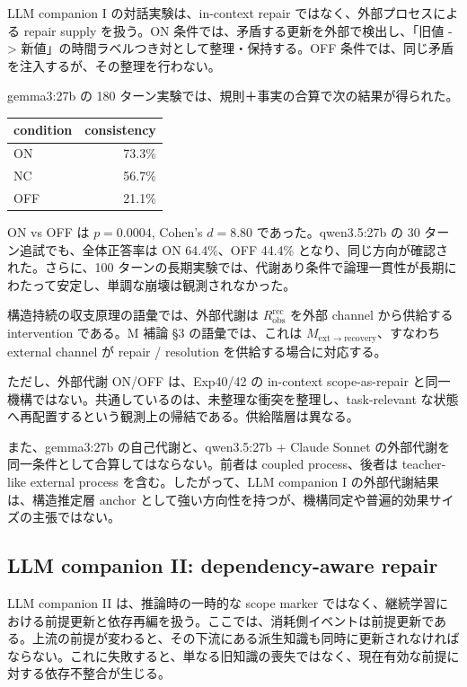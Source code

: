 \documentclass[12pt,a4paper]{article}
\begin{document}
LLM companion I の対話実験は、in-context repair ではなく、外部プロセスによる repair supply を扱う。ON 条件では、矛盾する更新を外部で検出し、「旧値 -\textgreater{} 新値」の時間ラベルつき対として整理・保持する。OFF 条件では、同じ矛盾を注入するが、その整理を行わない。

gemma3:27b の 180 ターン実験では、規則＋事実の合算で次の結果が得られた。

{\def\LTcaptype{table} %
\begin{longtable}[]{@{}lr@{}}
\toprule\noalign{}
condition & consistency \\
\midrule\noalign{}
\endhead
\bottomrule\noalign{}
\endlastfoot
ON & 73.3\% \\
NC & 56.7\% \\
OFF & 21.1\% \\
\end{longtable}
}

ON vs OFF は \(p=0.0004\), Cohen's \(d=8.80\) であった。qwen3.5:27b の 30 ターン追試でも、全体正答率は ON 64.4\%、OFF 44.4\% となり、同じ方向が確認された。さらに、100 ターンの長期実験では、代謝あり条件で論理一貫性が長期にわたって安定し、単調な崩壊は観測されなかった。

構造持続の収支原理の語彙では、外部代謝は \(R_{\mathrm{obs}}^{\mathrm{rec}}\) を外部 channel から供給する intervention である。M 補論 §3 の語彙では、これは \(M_{\mathrm{ext}\to\mathrm{recovery}}\)、すなわち external channel が repair / resolution を供給する場合に対応する。

ただし、外部代謝 ON/OFF は、Exp40/42 の in-context scope-as-repair と同一機構ではない。共通しているのは、未整理な衝突を整理し、task-relevant な状態へ再配置するという観測上の帰結である。供給階層は異なる。

また、gemma3:27b の自己代謝と、qwen3.5:27b + Claude Sonnet の外部代謝を同一条件として合算してはならない。前者は coupled process、後者は teacher-like external process を含む。したがって、LLM companion I の外部代謝結果は、構造推定層 anchor として強い方向性を持つが、機構同定や普遍的効果サイズの主張ではない。

\subsection{LLM companion II: dependency-aware repair}\label{llm-companion-ii-dependency-aware-repair}

LLM companion II は、推論時の一時的な scope marker ではなく、継続学習における前提更新と依存再編を扱う。ここでは、消耗側イベントは前提更新である。上流の前提が変わると、その下流にある派生知識も同時に更新されなければならない。これに失敗すると、単なる旧知識の喪失ではなく、現在有効な前提に対する依存不整合が生じる。
\end{document}
